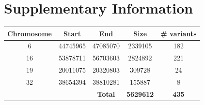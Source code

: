 \clearpage
\renewcommand{\bibname}{References}

\begingroup
    \setlength{\bibsep}{10pt}
    \linespread{1}\selectfont
    
\endgroup

\clearpage
\beginsupplement
\section{Supplementary Information}

\begin{table}[h] \centering
    \begin{tabular}{|c|c|c|c|c|} 
        \hline Chromosome & Start & End & Size & \# variants \\ \hline
        6 & 44745965 & 47085070 & 2339105 & 182 \\
        16 & 53878711 & 56703603 & 2824892 & 221 \\
        19 & 20011075 & 20320803 & 309728 & 24 \\
        32 & 38654394 & 38810281 & 155887 & 8 \\
        \hline &&   \textbf{Total}   &   \textbf{5629612}    &   \textbf{435} \\
    \hline \end{tabular}
\end{table}


